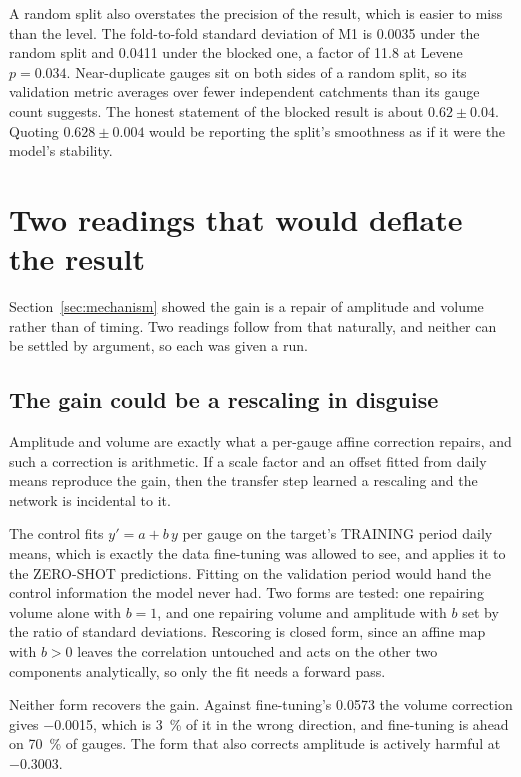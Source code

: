 \documentclass[11pt,a4paper]{article}
\begin{document}
A random split also overstates the precision of the result, which is easier to miss than the level. The fold-to-fold standard deviation of M1 is \num{0.0035} under the random split and \num{0.0411} under the blocked one, a factor of \num{11.8} at Levene $p = \num{0.034}$. Near-duplicate gauges sit on both sides of a random split, so its validation metric averages over fewer independent catchments than its gauge count suggests. The honest statement of the blocked result is about $0.62 \pm 0.04$. Quoting $0.628 \pm 0.004$ would be reporting the split's smoothness as if it were the model's stability.


\section{Two readings that would deflate the result}\label{sec:objections}
Section~\ref{sec:mechanism} showed the gain is a repair of amplitude and volume rather than of timing. Two readings follow from that naturally, and neither can be settled by argument, so each was given a run.

\subsection{The gain could be a rescaling in disguise}
Amplitude and volume are exactly what a per-gauge affine correction repairs, and such a correction is arithmetic. If a scale factor and an offset fitted from daily means reproduce the gain, then the transfer step learned a rescaling and the network is incidental to it.

The control fits $y' = a + b\,y$ per gauge on the target's TRAINING period daily means, which is exactly the data fine-tuning was allowed to see, and applies it to the ZERO-SHOT predictions. Fitting on the validation period would hand the control information the model never had. Two forms are tested: one repairing volume alone with $b = 1$, and one repairing volume and amplitude with $b$ set by the ratio of standard deviations. Rescoring is closed form, since an affine map with $b > 0$ leaves the correlation untouched and acts on the other two components analytically, so only the fit needs a forward pass.

Neither form recovers the gain. Against fine-tuning's \num{+0.0573} the volume correction gives \num{-0.0015}, which is \SI{3}{\percent} of it in the wrong direction, and fine-tuning is ahead on \SI{70}{\percent} of gauges. The form that also corrects amplitude is actively harmful at \num{-0.3003}.
\end{document}
